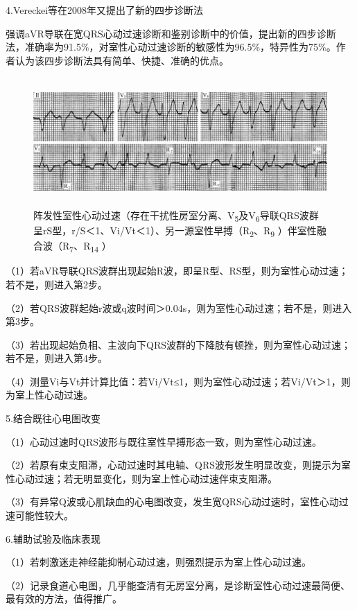 4.Vereckei等在2008年又提出了新的四步诊断法

强调aVR导联在宽QRS心动过速诊断和鉴别诊断中的价值，提出新的四步诊断法，准确率为91.5\%，对室性心动过速诊断的敏感性为96.5\%，特异性为75\%。作者认为该四步诊断法具有简单、快捷、准确的优点。

\begin{figure}[!htbp]
 \centering
 \includegraphics[width=5.78125in,height=1.92708in]{./images/Image00516.jpg}
 \captionsetup{justification=centering}
 \caption{阵发性室性心动过速（存在干扰性房室分离、V\textsubscript{5}及V\textsubscript{6}导联QRS波群呈rS型，r/S＜1、Vi/Vt＜1）、另一源室性早搏（R\textsubscript{2}、R\textsubscript{9} ）伴室性融合波（R\textsubscript{7}、R\textsubscript{14} ）}
 \label{fig31-13}
  \end{figure} 


（1）若aVR导联QRS波群出现起始R波，即呈R型、RS型，则为室性心动过速；若不是，则进入第2步。

（2）若QRS波群起始r波或q波时间＞0.04s，则为室性心动过速；若不是，则进入第3步。

（3）若出现起始负相、主波向下QRS波群的下降肢有顿挫，则为室性心动过速；若不是，则进入第4步。

（4）测量Vi与Vt并计算比值：若Vi/Vt≤1，则为室性心动过速；若Vi/Vt＞1，则为室上性心动过速。

5.结合既往心电图改变

（1）心动过速时QRS波形与既往室性早搏形态一致，则为室性心动过速。

（2）若原有束支阻滞，心动过速时其电轴、QRS波形发生明显改变，则提示为室性心动过速；若无明显变化，则为室上性心动过速伴束支阻滞。

（3）有异常Q波或心肌缺血的心电图改变，发生宽QRS心动过速时，室性心动过速可能性较大。

6.辅助试验及临床表现

（1）若刺激迷走神经能抑制心动过速，则强烈提示为室上性心动过速。

（2）记录食道心电图，几乎能查清有无房室分离，是诊断室性心动过速最简便、最有效的方法，值得推广。

